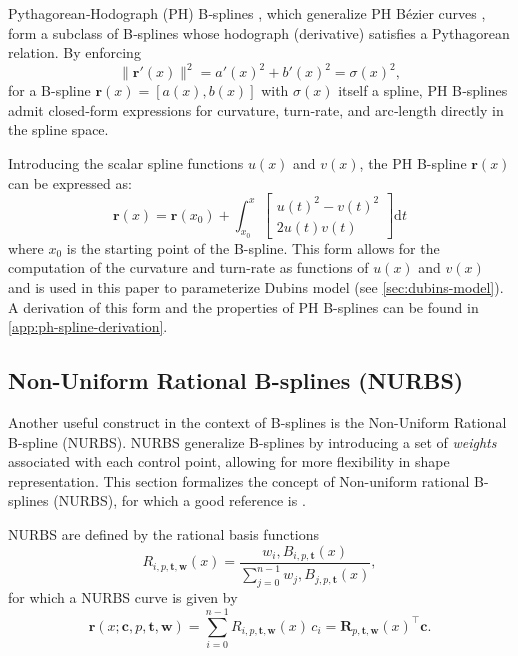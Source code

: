 Pythagorean‐Hodograph (PH) B‐splines \citep{Albrecht2016}, which generalize PH Bézier curves \citep{Farouki1990}, form a subclass of B‐splines whose hodograph (derivative) satisfies a Pythagorean relation.  By enforcing 
\[
  \|\mathbf r'(x)\|^2 = a'(x)^2 + b'(x)^2 = \sigma(x)^2,
\]
for a B-spline $\mathbf r(x) = [a(x), b(x)]$ with \(\sigma(x)\) itself a spline, PH B‐splines admit closed‐form expressions for curvature, turn‐rate, and arc‐length directly in the spline space.  

Introducing the scalar spline functions $u(x)$ and $v(x)$, the PH B-spline $\mathbf r(x)$ can be expressed as:
\begin{equation}\label{eq:ph-b-spline}
    \mathbf r(x) = \mathbf r(x_0) + \int_{x_0}^x 
    \begin{bmatrix}
        u(t)^2 - v(t)^2 \\
        2u(t)v(t)
    \end{bmatrix} \mathrm{d}t
\end{equation}
where $x_0$ is the starting point of the B-spline. This form allows for the computation of the curvature and turn-rate as functions of $u(x)$ and $v(x)$ and is used in this paper to parameterize Dubins model (see \cref{sec:dubins-model}). A derivation of this form and the properties of PH B-splines can be found in \cref{app:ph-spline-derivation}.

\subsection{Non-Uniform Rational B-splines (NURBS)}
Another useful construct in the context of B-splines is the Non-Uniform Rational B-spline (NURBS). NURBS generalize B-splines by introducing a set of \emph{weights} associated with each control point, allowing for more flexibility in shape representation.
This section formalizes the concept of Non-uniform rational B-splines (NURBS), for which a good reference is \cite{Piegl1997}. 

NURBS are defined by the rational basis functions
\begin{equation}\label{eq:nurbs-basis}
R_{i,p,\mathbf t, \mathbf w}(x)  = \frac{w_i,B_{i,p,\mathbf t}(x)}{\sum_{j=0}^{n-1}w_j,B_{j,p,\mathbf t}(x)},
\end{equation}
for which a NURBS curve is given by
\begin{equation}\label{eq:nurbs-curve}
\mathbf r(x; \mathbf c, p, \mathbf t, \mathbf w)  = \sum_{i=0}^{n-1}R_{i,p,\mathbf t, \mathbf w}(x)\,c_i
= \mathbf R_{p,\mathbf t, \mathbf w}(x)^\top \mathbf c.
\end{equation}

